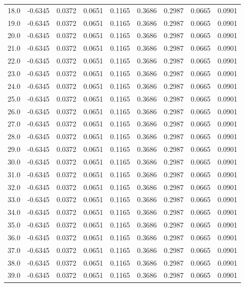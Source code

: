 \begin{longtable}{lrrrrrrrr}
18.0 & -0.6345 & 0.0372 & 0.0651 & 0.1165 & 0.3686 & 0.2987 & 0.0665 & 0.0901 \\
19.0 & -0.6345 & 0.0372 & 0.0651 & 0.1165 & 0.3686 & 0.2987 & 0.0665 & 0.0901 \\
20.0 & -0.6345 & 0.0372 & 0.0651 & 0.1165 & 0.3686 & 0.2987 & 0.0665 & 0.0901 \\
21.0 & -0.6345 & 0.0372 & 0.0651 & 0.1165 & 0.3686 & 0.2987 & 0.0665 & 0.0901 \\
22.0 & -0.6345 & 0.0372 & 0.0651 & 0.1165 & 0.3686 & 0.2987 & 0.0665 & 0.0901 \\
23.0 & -0.6345 & 0.0372 & 0.0651 & 0.1165 & 0.3686 & 0.2987 & 0.0665 & 0.0901 \\
24.0 & -0.6345 & 0.0372 & 0.0651 & 0.1165 & 0.3686 & 0.2987 & 0.0665 & 0.0901 \\
25.0 & -0.6345 & 0.0372 & 0.0651 & 0.1165 & 0.3686 & 0.2987 & 0.0665 & 0.0901 \\
26.0 & -0.6345 & 0.0372 & 0.0651 & 0.1165 & 0.3686 & 0.2987 & 0.0665 & 0.0901 \\
27.0 & -0.6345 & 0.0372 & 0.0651 & 0.1165 & 0.3686 & 0.2987 & 0.0665 & 0.0901 \\
28.0 & -0.6345 & 0.0372 & 0.0651 & 0.1165 & 0.3686 & 0.2987 & 0.0665 & 0.0901 \\
29.0 & -0.6345 & 0.0372 & 0.0651 & 0.1165 & 0.3686 & 0.2987 & 0.0665 & 0.0901 \\
30.0 & -0.6345 & 0.0372 & 0.0651 & 0.1165 & 0.3686 & 0.2987 & 0.0665 & 0.0901 \\
31.0 & -0.6345 & 0.0372 & 0.0651 & 0.1165 & 0.3686 & 0.2987 & 0.0665 & 0.0901 \\
32.0 & -0.6345 & 0.0372 & 0.0651 & 0.1165 & 0.3686 & 0.2987 & 0.0665 & 0.0901 \\
33.0 & -0.6345 & 0.0372 & 0.0651 & 0.1165 & 0.3686 & 0.2987 & 0.0665 & 0.0901 \\
34.0 & -0.6345 & 0.0372 & 0.0651 & 0.1165 & 0.3686 & 0.2987 & 0.0665 & 0.0901 \\
35.0 & -0.6345 & 0.0372 & 0.0651 & 0.1165 & 0.3686 & 0.2987 & 0.0665 & 0.0901 \\
36.0 & -0.6345 & 0.0372 & 0.0651 & 0.1165 & 0.3686 & 0.2987 & 0.0665 & 0.0901 \\
37.0 & -0.6345 & 0.0372 & 0.0651 & 0.1165 & 0.3686 & 0.2987 & 0.0665 & 0.0901 \\
38.0 & -0.6345 & 0.0372 & 0.0651 & 0.1165 & 0.3686 & 0.2987 & 0.0665 & 0.0901 \\
39.0 & -0.6345 & 0.0372 & 0.0651 & 0.1165 & 0.3686 & 0.2987 & 0.0665 & 0.0901 \\

\end{longtable}
